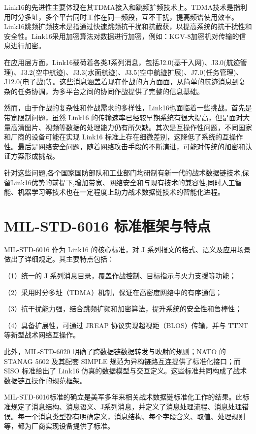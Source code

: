 Link16的先进性主要体现在其TDMA接入和跳频扩频技术上。TDMA技术是指利用时分多址，多个平台同时工作在同一频段，互不干扰，提高频谱使用效率。Link16跳频扩频技术是指通过快速跳频抗干扰和抗截获，以提高系统的抗干扰性和安全性。Link16采用加密算法对数据进行加密，例如：KGV-8加密机对传输的信息进行加密。

在应用层方面，Link16载荷着各类J系列消息，包括J2.0(基干入网)、J3.0(航迹管理)、J3.2(空中航迹)、J3.3(水面航迹)、J3.5(空中航迹扩展)、J7.0(任务管理)、J12.0(电子战)等。这些消息涵盖着现在作战的方方面面，从简单的航迹消息到复杂的任务协调，为多平台之间的协同作战提供了完整的信息基础。

然而，由于作战的复杂性和作战需求的多样性，Link16也面临着一些挑战。首先是带宽限制问题，虽然 Link16 的传输速率已经较早期系统有很大提高，但是面对大量高清图片、视频等数据的处理能力仍有所欠缺。其次是互操作性问题，不同国家和厂商的设备可能在实现 Link16 标准上存在细微差别，这降低了系统的互操作性。最后是网络安全问题，随着网络攻击手段的不断演进，可能对传统的加密和认证方案形成挑战。

针对这些问题,各个国家国防部队和工业部门均研制有新一代的战术数据链技术,保留Link16优势的前提下,增加带宽、网络安全和与现有技术的兼容性,同时人工智能、机器学习等技术也在一定程度上助力战术数据链技术的智能化进程。

\section{MIL-STD-6016 标准框架与特点}
MIL-STD-6016 作为 {Link16} 的核心标准，对 J 系列报文的格式、语义及应用场景做出了详细规定\cite{ASSIST_6016_2024,CJCSM_6235_01_2025}。其主要特点包括：  

（1）统一的 J 系列消息目录，覆盖作战控制、目标指示与火力支援等功能；  

（2）采用时分多址（TDMA）机制，保证在高密度网络中的有序通信；  

（3）抗干扰能力强，结合跳频扩频和加密算法，提升系统的安全性和鲁棒性；  

（4）具备扩展性，可通过 {JREAP} 协议实现超视距（BLOS）传输，并与 {TTNT} 等新型战术网络互操作。

此外，MIL-STD-6020 明确了跨数据链数据转发与映射的规则；NATO 的 STANAG 5602 及其配套 SIMPLE 规范为异构链路互连提供了标准化接口；而 SISO 标准给出了 {Link16} 仿真的数据模型与交互定义\cite{Ultra_MDLMS_2021}。这些标准共同构成了战术数据链互操作的规范框架。

MIL-STD-6016标准的确立是美军多年来相关战术数据链标准化工作的结果。此标准规定了消息结构、消息语义、J系列消息，并定义了消息处理流程、消息处理错误。每一个消息类型都有明确定义，消息结构、每个字段含义、取值、处理规则等，都为厂商实现设备提供了标准。

